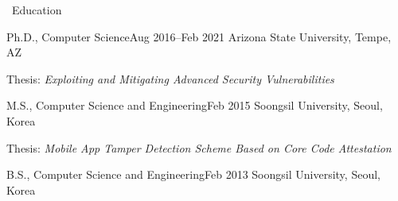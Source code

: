 \documentclass{resume} %
\begin{document}
\begin{rSection}{\faGenderless~Education}

	\begin{rSubsection}
		{Ph.D., Computer Science}{Aug 2016--Feb 2021}
		{Arizona State University, Tempe, AZ}{}
		\item Thesis: \emph{Exploiting and Mitigating Advanced Security Vulnerabilities}
	\end{rSubsection}
	\vspace{-2mm}
	\begin{rSubsection}
		{M.S., Computer Science and Engineering}{Feb 2015}
		{Soongsil University, Seoul, Korea}{}
		\item Thesis: \emph{Mobile App Tamper Detection Scheme Based on Core Code Attestation}
		
	\end{rSubsection}
	\vspace{-2mm}
	\begin{rSubsection2}
		{B.S., Computer Science and Engineering}{Feb 2013}
		{Soongsil University, Seoul, Korea}{}
	\end{rSubsection2}

\end{rSection}

\end{document}
